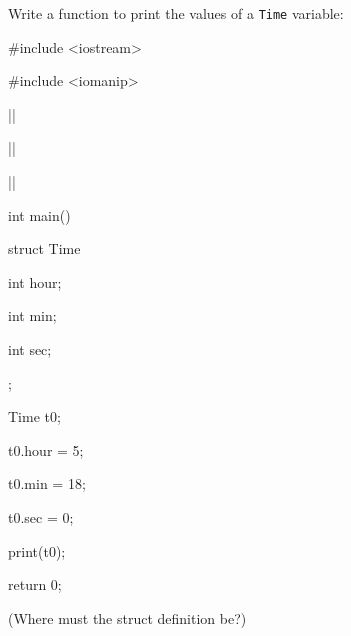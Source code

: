 Write a function to print the values of a \texttt{Time} variable:



\begin{consolethree}[escapeinside=||]

#include <iostream>

#include <iomanip>



||

|\EMPHASIZE{\{}|

|\EMPHASIZE{\}}|



int main()

{

  struct Time

  {

    int hour;

    int min;

    int sec;

  };



  Time t0;

  t0.hour = 5;

  t0.min = 18;

  t0.sec = 0;



  print(t0);



  return 0;

}

\end{consolethree}



(Where must the struct definition be?)

